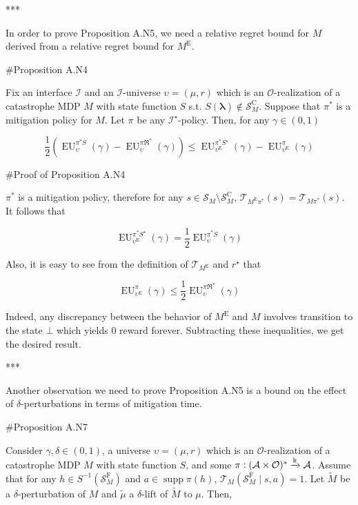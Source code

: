 \documentclass[a4paper]{article}
\DeclareMathOperator{\Supp}{supp}
\newcommand{\AP}[1]{\left(#1\right)}
\newcommand{\Estr}{\boldsymbol{\lambda}}
\newcommand{\M}{\xrightarrow{\textnormal{k}}}
\newcommand{\Ob}{\mathcal{O}}
\newcommand{\A}{\mathcal{A}}
\newcommand{\St}{\mathcal{S}}
\newcommand{\T}{\mathcal{T}}
\newcommand{\In}{\mathcal{I}}
\newcommand{\FH}{(\A \times \Ob)^*}
\newcommand{\RMC}{\mathrm{C}}
\newcommand{\RMD}{\mathrm{D}}
\newcommand{\RME}{\mathrm{E}}
\newcommand{\RMF}{\mathrm{F}}
\newcommand{\SF}{\St^{\RMF}}
\newcommand{\SD}{\St^{\RMD}}
\newcommand{\SC}{\St^{\RMC}}
\newcommand{\ME}{M^{\RME}}
\newcommand{\EU}{\operatorname{EU}}
\begin{document}
***

In order to prove Proposition A.N5, we need a relative regret bound for $M$ derived from a relative regret bound for $\ME$.

\#Proposition A.N4

Fix an interface $\In$ and an $\In$-universe $\upsilon=(\mu,r)$ which is an $\Ob$-realization of a catastrophe MDP $M$ with state function $S$ s.t. $S(\Estr)\not\in\SC_M$. Suppose that $\pi^*$ is a mitigation policy for $M$. Let $\pi$ be any $\In^\star$-policy. Then, for any $\gamma\in(0,1)$

$$\frac{1}{2}\AP{\EU_{\upsilon}^{\pi^* S}(\gamma)-\EU_{\upsilon}^{\pi\Re^*}(\gamma)} \leq \EU_{\upsilon^\RME}^{\pi^* S^\star}(\gamma)-\EU_{\upsilon^\RME}^{\pi}(\gamma)$$

\#Proof of Proposition A.N4

$\pi^*$ is a mitigation policy, therefore for any $s \in \St_M \setminus \SC_M$, $\T_{\ME\pi^*}(s)=\T_{M\pi^*}(s)$. It follows that 

$$\EU_{\upsilon^\RME}^{\pi^* S^\star}(\gamma) = \frac{1}{2}\EU_{\upsilon}^{\pi^* S}(\gamma)$$

Also, it is easy to see from the definition of $\T_{\ME}$ and $r^\star$ that

$$\EU_{\upsilon^\RME}^{\pi}(\gamma) \leq \frac{1}{2}\EU_{\upsilon}^{\pi\Re^*}(\gamma)$$

Indeed, any discrepancy between the behavior of $\ME$ and $M$ involves transition to the state $\bot$ which yields 0 reward forever. Subtracting these inequalities, we get the desired result.

***

Another observation we need to prove Proposition A.N5 is a bound on the effect of $\delta$-perturbations in terms of mitigation time.

\#Proposition A.N7

Consider $\gamma,\delta\in(0,1)$, a universe $\upsilon=(\mu,r)$ which is an $\Ob$-realization of a catastrophe MDP $M$ with state function $S$, and some $\pi: \FH \M \A$. Assume that for any $h \in S^{-1}\AP{\SF_M}$ and $a \in \Supp{\pi(h)}$, $\T_M\AP{\SF_M \mid s,a} = 1$. Let $\tilde{M}$ be a $\delta$-perturbation of $M$ and $\tilde{\mu}$ a $\delta$-lift of $\tilde{M}$ to $\mu$. Then,



\end{document}
